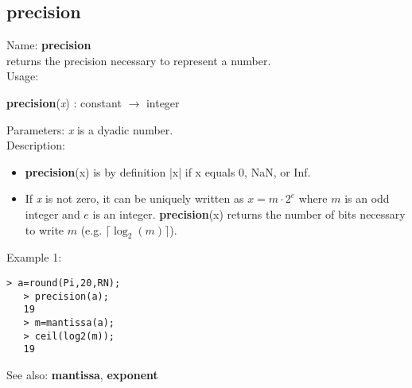 \subsection{ precision }
\noindent Name: \textbf{precision}\\
returns the precision necessary to represent a number.\\

\noindent Usage: 
\begin{center}
\textbf{precision}(\emph{x}) : \textsf{constant} $\rightarrow$ \textsf{integer}\\
\end{center}
Parameters: 
\emph{x} is a dyadic number.\\

\noindent Description: \begin{itemize}

\item \textbf{precision}(x) is by definition |x| if x equals 0, NaN, or Inf.

\item If \emph{x} is not zero, it can be uniquely written as $x = m \cdot 2^e$ where
   $m$ is an odd integer and $e$ is an integer. \textbf{precision}(x) returns the number
   of bits necessary to write $m$ (e.g. $\lceil \log_2(m) \rceil$).
\end{itemize}
\noindent Example 1: 
\begin{center}\begin{minipage}{14.8cm}\begin{Verbatim}[frame=single]
   > a=round(Pi,20,RN);
   > precision(a);
   19
   > m=mantissa(a);
   > ceil(log2(m));
   19
\end{Verbatim}
\end{minipage}\end{center}
See also: \textbf{mantissa}, \textbf{exponent}
